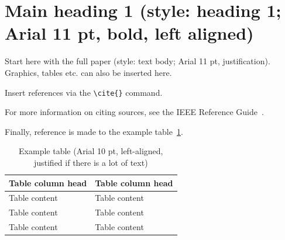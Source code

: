 \newcommand{\papertitel}{Title (style: title; Arial 14 pt, bold, left aligned)}

\newcommand{\speaker}{Academic Title, first name, last name, company, country of speaker}

\newcommand{\coautors}{Academic Title, first name, last name, company, country of co-author\\
	Other co-authors below with the same information, each in a new line\\
	(style: authors; Arial 11 pt, left-aligned)}

\newcommand{\keywords}{Mode-stirred chamber, Reverberation chamber, Statistical distribution, Correlation, Transmission line theory, Immunity test, Electromagnetic compatibility, Directivity, Absorber chamber, Waveguide, DUT model}



\section{Main heading 1 (style: heading 1; Arial 11 pt, bold, left aligned)}

Start here with the full paper (style: text body; Arial 11 pt, justification). Graphics, tables etc. can also be inserted here.

Insert references via the \verb|\cite{}| command.

\nocite{source1,source2,source3,source4,source5}

For more information on citing sources, see the IEEE Reference Guide~\cite{ieee:style_manual}.

Finally, reference is made to the example table~\ref{tab:example}.

\begin{table}
	\centering
		\begin{tabular}{@{}p{}p{}@{}}
			\toprule
			\bfseries Table column head & \bfseries Table column head \\
			\midrule
			Table content & Table content \\
			\midrule
			Table content & Table content \\
			\midrule
			Table content & Table content \\
			\bottomrule
	\end{tabular}
	\caption{Example table (Arial 10 pt, left-aligned, justified if there is a lot of text)}
	\label{tab:example}
\end{table}

